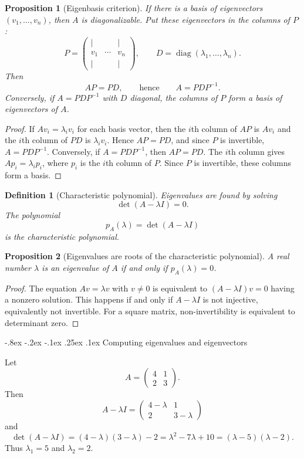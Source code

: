 \documentclass[10pt]{article}
\makeatletter
\renewcommand\subsubsection{\@startsection{subsubsection}{3}{\z@}%
  {-.8ex \@plus -.2ex \@minus -.1ex}%
  {.25ex \@plus .1ex}%
  {\normalfont\normalsize\bfseries\itshape}}
\theoremstyle{compactdefinition}
\newtheorem{definition}{Definition}[section]
\theoremstyle{compactproposition}
\newtheorem{proposition}{Proposition}[section]
\newcommand{\diag}{\operatorname{diag}}
\makeatother
\begin{document}
\begin{proposition}[Eigenbasis criterion]
If there is a basis of eigenvectors $(v_1,\ldots,v_n)$, then $A$ is
diagonalizable. Put these eigenvectors in the columns of $P$:
\[
P=
\begin{pmatrix}
|&&|\\
v_1&\cdots&v_n\\
|&&|
\end{pmatrix},
\qquad
D=\diag(\lambda_1,\ldots,\lambda_n).
\]
Then
\[
AP=PD,
\qquad\text{hence}\qquad
A=PDP^{-1}.
\]
Conversely, if $A=PDP^{-1}$ with $D$ diagonal, the columns of $P$ form a basis
of eigenvectors of $A$.
\end{proposition}

\begin{proof}
If $Av_i=\lambda_i v_i$ for each basis vector, then the $i$th column of $AP$ is
$Av_i$ and the $i$th column of $PD$ is $\lambda_i v_i$. Hence $AP=PD$, and
since $P$ is invertible, $A=PDP^{-1}$. Conversely, if $A=PDP^{-1}$, then
$AP=PD$. The $i$th column gives $Ap_i=\lambda_i p_i$, where $p_i$ is the $i$th
column of $P$. Since $P$ is invertible, these columns form a basis.
\end{proof}

\begin{definition}[Characteristic polynomial]
Eigenvalues are found by solving
\[
\det(A-\lambda I)=0.
\]
The polynomial
\[
p_A(\lambda)=\det(A-\lambda I)
\]
is the characteristic polynomial.
\end{definition}

\begin{proposition}[Eigenvalues are roots of the characteristic polynomial]
A real number $\lambda$ is an eigenvalue of $A$ if and only if
$p_A(\lambda)=0$.
\end{proposition}

\begin{proof}
The equation $Av=\lambda v$ with $v\neq0$ is equivalent to
$(A-\lambda I)v=0$ having a nonzero solution. This happens if and only if
$A-\lambda I$ is not injective, equivalently not invertible. For a square
matrix, non-invertibility is equivalent to determinant zero.
\end{proof}

\subsubsection{Computing eigenvalues and eigenvectors}

Let
\[
A=
\begin{pmatrix}
4&1\\
2&3
\end{pmatrix}.
\]
Then
\[
A-\lambda I=
\begin{pmatrix}
4-\lambda&1\\
2&3-\lambda
\end{pmatrix}
\]
and
\[
\det(A-\lambda I)
=(4-\lambda)(3-\lambda)-2
=\lambda^2-7\lambda+10
=(\lambda-5)(\lambda-2).
\]
Thus $\lambda_1=5$ and $\lambda_2=2$.
\end{document}
